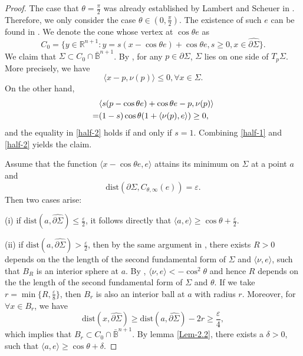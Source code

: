 \documentclass[11pt,reqno]{amsart}
\theoremstyle{definition}
\theoremstyle{remark}
\numberwithin{equation}{section}
\renewcommand{\(}{\left(}
\renewcommand{\)}{\right)}
\renewcommand{\-}{\overline}
\begin{document}
\begin{proof}
	The case that $\theta=\frac{\pi}{2}$ was already established by Lambert and Scheuer in \cite[Lemma 12]{Lambert-Scheuer2016}. Therefore, we only  consider the case $\theta\in(0,\frac{\pi}{2})$. The existence of such $e$ can be found in \cite[Proposition 2.16]{Weng-Xia2022}. We denote the cone whose vertex at $\cos\theta e$ as 
	\begin{equation}\label{defn-cone}
		C_0=\{y\in\mathbb{R}^{n+1}:y=s(x-\cos\theta e)+\cos\theta e, s\geq 0,x\in\widehat{\partial\Sigma}\}.
	\end{equation}
We claim that $\Sigma\subset C_0\cap \bar{\mathbb{B}}^{n+1}$.  By \cite[Proposition 2.15]{Weng-Xia2022}, for any $p\in\partial\Sigma$, $\Sigma$ lies on one side of $T_{p}{\Sigma}$. More precisely, we have
\begin{equation}\label{half-1}
	\langle x-p,\nu(p)\rangle\leq 0, \forall x\in\Sigma.
\end{equation}
On the other hand,
\begin{align}
	&\langle s(p-\cos\theta e)+\cos\theta e-p,\nu(p)\rangle\notag\\
	=&(1-s)\cos\theta(1+\langle \nu(p),e\rangle)\geq 0,\label{half-2}
\end{align}
and the equality in \eqref{half-2} holds if and only if $s=1$. Combining \eqref{half-1} and \eqref{half-2} yields the claim. 

Assume that the function $\langle x-\cos\theta e,e\rangle$ attains its minimum  on $\Sigma$ at a point $a$ and 
\begin{equation}\label{distepsilon}
	\mathrm{dist}(\partial\Sigma,C_{\theta,\infty}(e))=\varepsilon.
\end{equation}
Then two cases arise:

(i) if $\mathrm{dist}(a,\widehat{\partial\Sigma})\leq\frac{\varepsilon}{2}$,  it follows directly that $\langle a,e\rangle\geq \cos\theta+\frac{\varepsilon}{2}$.

(ii) if $\mathrm{dist}(a,\widehat{\partial\Sigma})>\frac{\varepsilon}{2}$, then by the same argument in \cite[Lemma 12]{Lambert-Scheuer2016}, there exists $R>0$ depends on the the length of the second fundamental form of $\Sigma$ and $\langle\nu,e\rangle$, such that $B_R$ is an interior sphere at $a$. By \cite[Proposition 2.16]{Weng-Xia2022}, $\langle\nu,e\rangle<-\cos^2{\theta}$ and hence $R$ depends on the the length of the second fundamental form of $\Sigma$ and $\theta$. If we take $r=\min\{R,\frac{\varepsilon}{8}\}$, then $B_r$ is also an interior ball at $a$ with radius $r$. Moreover, for $\forall x\in B_r$, we have
\begin{equation}
	\mathrm{dist}(x,\widehat{\partial\Sigma})\geq \mathrm{dist}(a,\widehat{\partial\Sigma})-2r\geq \frac{\varepsilon}{4},
\end{equation}
which implies that $B_r\subset C_0\cap\bar{\mathbb{B}}^{n+1}$. By lemma \ref{Lem-2.2}, there exists a $\delta>0$, such that $\langle a,e\rangle\geq \cos\theta+\delta$.
\end{proof}
\end{document}
